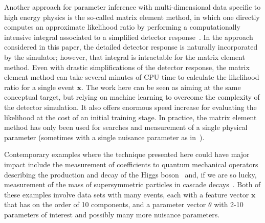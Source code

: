 \documentclass[12pt]{article}
\numberwithin{equation}{section}
\theoremstyle{plain}
\begin{document}


Another approach for parameter inference with multi-dimensional data specific to
high energy physics is the so-called matrix element
method, in which one  directly computes an approximate likelihood ratio by
performing a computationally intensive integral associated to a simplified detector
response~\citep{Volobouev:2011vb}. In the approach considered in this paper, the
detailed detector response is naturally incorporated by the simulator; however, that integral
is intractable for the matrix element method. Even with drastic simplifications of the detector response, the
matrix element method can take several minutes of CPU time to calculate the
likelihood ratio for a single event $\mathbf{x}$. The work here can be seen as aiming
at the same conceptual target, but relying on machine learning to overcome the
complexity of the detector simulation. It also offers enormous speed increase
for evaluating the likelihood at the cost of an initial training stage. In
practice, the matrix element method has only been used for searches and
measurement of a single physical parameter (sometimes with a single nuisance
parameter as in~\citep{Aaltonen:2010yz}).

Contemporary examples where the technique presented here could have major impact
include the measurement of coefficients to quantum mechanical operators
describing the production and decay of the Higgs boson~\citep{Chen:2014pia} and, if we are so
lucky, measurement of the mass of supersymmetric particles in cascade
decays~\citep{Allanach:2000kt}.  Both of these examples involve data sets with
many events, each with a feature vector $\mathbf{x}$ that has on the order of 10
components, and a parameter vector $\theta$ with 2-10 parameters of interest and
possibly many more nuisance parameters.
\end{document}
